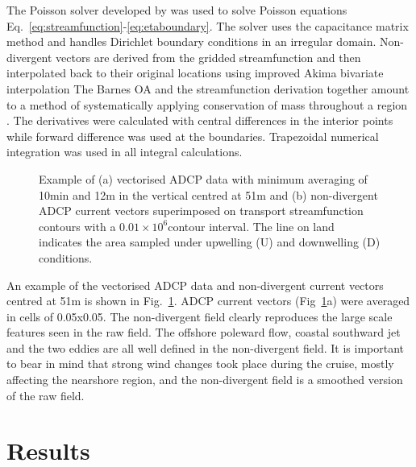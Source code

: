 The Poisson solver developed by \citet{cummins94} was used to
solve Poisson equations
Eq.~\ref{eq:streamfunction}-\ref{eq:etaboundary}. The solver uses
the capacitance matrix method and handles Dirichlet boundary
conditions in an irregular domain. Non-divergent vectors are
derived from the gridded streamfunction and then interpolated back
to their original locations using improved Akima bivariate
interpolation \citep{akima96} The Barnes OA and the streamfunction
derivation together amount to a method of systematically applying
conservation of mass throughout a region \citep{Pierce00}. The
derivatives were calculated with central differences in the
interior points while forward difference was used at the
boundaries. Trapezoidal numerical integration was used in all
integral calculations.

\begin{figure}[!ht]
\centering {}  \caption{Example of
(a) vectorised ADCP data with minimum averaging of 10min and 12m
in the vertical centred at 51m and (b) non-divergent ADCP current
vectors superimposed on transport streamfunction contours with a
$0.01\times 10^{6}$\tra contour interval. The line on land
indicates the area sampled under upwelling (U) and downwelling (D)
conditions.} \label{fig:cd105_stream}\end{figure}

An example of the vectorised ADCP data and non-divergent current
vectors centred at 51m is shown in Fig.~\ref{fig:cd105_stream}.
ADCP current vectors (Fig~\ref{fig:cd105_stream}a) were averaged
in cells of 0.05x0.05\deg. The non-divergent field clearly
reproduces the large scale features seen in the raw field. The
offshore poleward flow, coastal southward jet and the two eddies
are all well defined in the non-divergent field. It is important
to bear in mind that strong wind changes took place during the
cruise, mostly affecting the nearshore region, and the
non-divergent field is a smoothed version of the raw field.

\section{Results}
